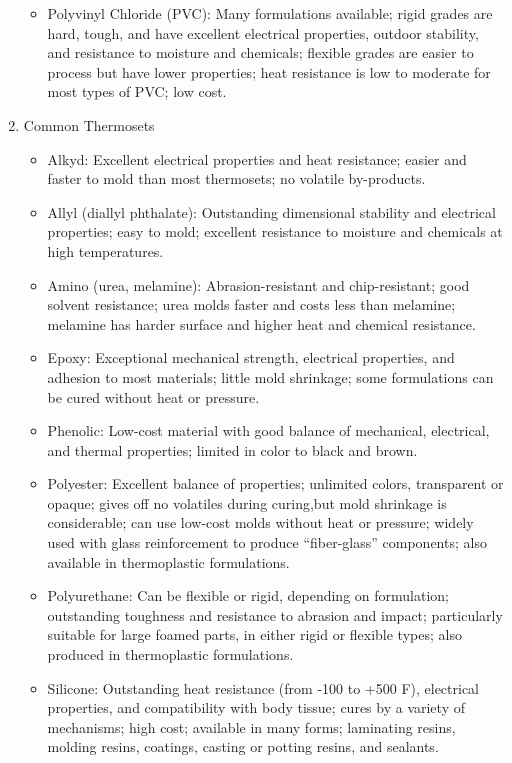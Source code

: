 \documentclass[a4paper,openany,12pt]{book}
\begin{document}
\begin{enumerate}
\begin{itemize}
\item Polyvinyl Chloride (PVC): Many formulations available; rigid grades
are hard, tough, and have excellent electrical properties, outdoor
stability, and resistance to moisture and chemicals; flexible grades
are easier to process but have lower properties; heat resistance is
low to moderate for most types of PVC; low cost.
\end{itemize}

\item Common Thermosets
\label{common-thermosets}
\begin{itemize}
\item Alkyd: Excellent electrical properties and heat resistance; easier and
faster to mold than most thermosets; no volatile by-products.

\item Allyl (diallyl phthalate): Outstanding dimensional stability and
electrical properties; easy to mold; excellent resistance to moisture
and chemicals at high temperatures.

\item Amino (urea, melamine): Abrasion-resistant and chip-resistant; good
solvent resistance; urea molds faster and costs less than melamine;
melamine has harder surface and higher heat and chemical resistance.

\item Epoxy: Exceptional mechanical strength, electrical properties, and
adhesion to most materials; little mold shrinkage; some formulations
can be cured without heat or pressure.

\item Phenolic: Low-cost material with good balance of mechanical,
electrical, and thermal properties; limited in color to black and
brown.

\item Polyester: Excellent balance of properties; unlimited colors,
transparent or opaque; gives off no volatiles during curing,but mold
shrinkage is considerable; can use low-cost molds without heat or
pressure; widely used with glass reinforcement to produce
``fiber-glass'' components; also available in thermoplastic
formulations.

\item Polyurethane: Can be flexible or rigid, depending on formulation;
outstanding toughness and resistance to abrasion and impact;
particularly suitable for large foamed parts, in either rigid or
flexible types; also produced in thermoplastic formulations.

\item Silicone: Outstanding heat resistance (from -100 to +500 F),
electrical properties, and compatibility with body tissue; cures by a
variety of mechanisms; high cost; available in many forms; laminating
resins, molding resins, coatings, casting or potting resins, and
sealants.
\end{itemize}
\end{enumerate}
\end{document}
